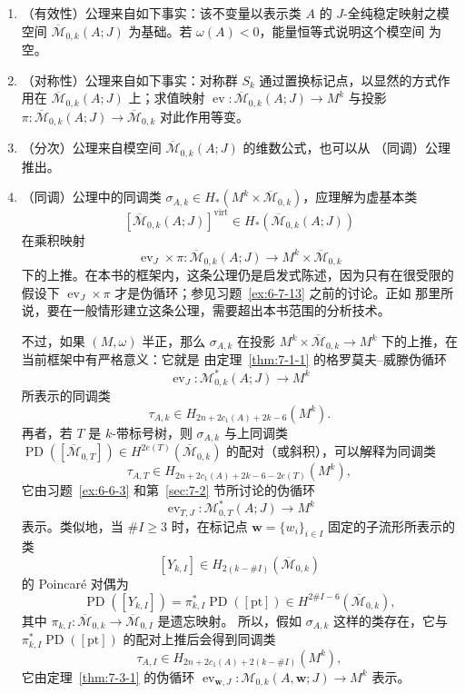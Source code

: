 \begin{remark}\label{rem:7-5-1}
\begin{enumerate}[label=\textup{(\roman*)},leftmargin=3em]
\item （有效性）公理来自如下事实：该不变量以表示类 $A$ 的 $J$-全纯稳定映射之模空间
$\overline{\mathcal M}_{0,k}(A;J)$ 为基础。若 $\omega(A)<0$，能量恒等式说明这个模空间
为空。
\item （对称性）公理来自如下事实：对称群 $S_k$ 通过置换标记点，以显然的方式作用在
$\overline{\mathcal M}_{0,k}(A;J)$ 上；求值映射
$\operatorname{ev}:\overline{\mathcal M}_{0,k}(A;J)\to M^k$ 与投影
$\pi:\overline{\mathcal M}_{0,k}(A;J)\to\overline{\mathcal M}_{0,k}$ 对此作用等变。
\item （分次）公理来自模空间 $\overline{\mathcal M}_{0,k}(A;J)$ 的维数公式，也可以从
（同调）公理推出。
\item （同调）公理中的同调类
$\sigma_{A,k}\in H_*(M^k\times\overline{\mathcal M}_{0,k})$，应理解为虚基本类
\[
  [\overline{\mathcal M}_{0,k}(A;J)]^{\mathrm{virt}}
  \in H_*(\overline{\mathcal M}_{0,k}(A;J))
\]
在乘积映射
\[
  \operatorname{ev}_J\times\pi:
  \overline{\mathcal M}_{0,k}(A;J)
  \longrightarrow M^k\times\overline{\mathcal M}_{0,k}
\]
下的上推。在本书的框架内，这条公理仍是启发式陈述，因为只有在很受限的假设下
$\operatorname{ev}_J\times\pi$ 才是伪循环；参见习题~\ref{ex:6-7-13} 之前的讨论。正如
那里所说，要在一般情形建立这条公理，需要超出本书范围的分析技术。

不过，如果 $(M,\omega)$ 半正，那么 $\sigma_{A,k}$ 在投影
$M^k\times\overline{\mathcal M}_{0,k}\to M^k$ 下的上推，在当前框架中有严格意义：它就是
由定理~\ref{thm:7-1-1} 的格罗莫夫--威滕伪循环
\[
  \operatorname{ev}_J:\mathcal M^*_{0,k}(A;J)\longrightarrow M^k
\]
所表示的同调类
\[
  \tau_{A,k}\in H_{2n+2c_1(A)+2k-6}(M^k).
\]
再者，若 $T$ 是 $k$-带标号树，则 $\sigma_{A,k}$ 与上同调类
$\operatorname{PD}([\overline{\mathcal M}_{0,T}])
\in H^{2e(T)}(\overline{\mathcal M}_{0,k})$ 的配对（或斜积），可以解释为同调类
\[
  \tau_{A,T}\in H_{2n+2c_1(A)+2k-6-2e(T)}(M^k),
\]
它由习题~\ref{ex:6-6-3} 和第~\ref{sec:7-2} 节所讨论的伪循环
\[
  \operatorname{ev}_{T,J}:\mathcal M^*_{0,T}(A;J)\longrightarrow M^k
\]
表示。类似地，当 $\#I\ge3$ 时，在标记点
$\mathbf w=\{w_i\}_{i\in I}$ 固定的子流形所表示的类
\[
  [Y_{k,I}]\in H_{2(k-\#I)}(\overline{\mathcal M}_{0,k})
\]
的 Poincaré 对偶为
\[
  \operatorname{PD}([Y_{k,I}])
  =\pi_{k,I}^*\operatorname{PD}([\mathrm{pt}])
  \in H^{2\#I-6}(\overline{\mathcal M}_{0,k}),
\]
其中 $\pi_{k,I}:\overline{\mathcal M}_{0,k}\to\overline{\mathcal M}_{0,I}$ 是遗忘映射。
所以，假如 $\sigma_{A,k}$ 这样的类存在，它与
$\pi_{k,I}^*\operatorname{PD}([\mathrm{pt}])$ 的配对上推后会得到同调类
\[
  \tau_{A,I}\in H_{2n+2c_1(A)+2(k-\#I)}(M^k),
\]
它由定理~\ref{thm:7-3-1} 的伪循环
$\operatorname{ev}_{\mathbf w,J}:\mathcal M_{0,k}(A,\mathbf w;J)\to M^k$ 表示。


\end{enumerate}
\end{remark}
